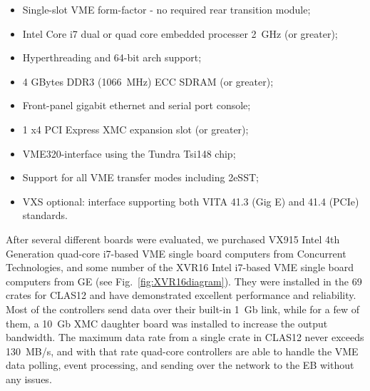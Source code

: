 \begin{itemize}
	\item Single-slot VME form-factor - no required rear transition module;
	\item Intel Core i7 dual or quad core embedded processer 2~GHz (or greater);
	\item Hyperthreading and 64-bit arch support;
	\item 4 GBytes DDR3 (1066~MHz) ECC SDRAM (or greater);
	\item Front-panel gigabit ethernet and serial port console;
	\item 1 x4 PCI Express XMC expansion slot (or greater);
	\item VME320-interface using the Tundra Tsi148 chip;
	\item Support for all VME transfer modes including 2eSST;
	\item VXS optional: interface supporting both VITA 41.3 (Gig E) and 41.4 (PCIe) standards.
\end{itemize}

After several different boards were evaluated, we purchased VX915 Intel 4th Generation quad-core i7-based VME single board computers from Concurrent Technologies, and some number of the XVR16 Intel i7-based VME single board computers from GE (see Fig.~\ref{fig:XVR16diagram}). They were installed in the 69 crates for CLAS12 and have demonstrated excellent performance and reliability. Most of the controllers send data over their built-in 1~Gb link, while for a few of them, a 10~Gb XMC daughter board was installed to increase the output bandwidth. The maximum data rate from a single crate in CLAS12 never exceeds 130~MB/s, and with that rate quad-core controllers are able to handle the VME data polling, event processing, and sending over the network to the EB without any issues. 


